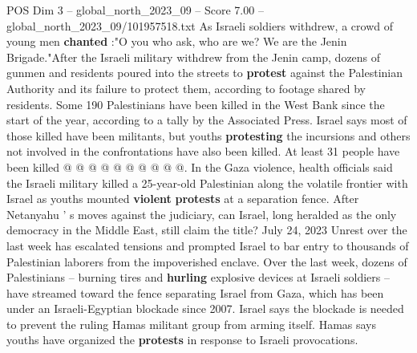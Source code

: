 \begin{textsample}{POS Dim 3 – global\_north\_2023\_09 – Score 7.00 – global\_north\_2023\_09/101957518.txt}
As Israeli soldiers withdrew, a crowd of young men \textbf{chanted} :"O you who ask, who are we?
We are the Jenin Brigade."After the Israeli military withdrew from the Jenin camp, dozens of gunmen and residents poured into the streets to \textbf{protest} against the Palestinian Authority and its failure to protect them, according to footage shared by residents.
Some 190 Palestinians have been killed in the West Bank since the start of the year, according to a tally by the Associated Press.
Israel says most of those killed have been militants, but youths \textbf{protesting} the incursions and others not involved in the confrontations have also been killed.
At least 31 people have been killed @ @ @ @ @ @ @ @ @ @.
In the Gaza violence, health officials said the Israeli military killed a 25-year-old Palestinian along the volatile frontier with Israel as youths mounted \textbf{violent} \textbf{protests} at a separation fence.
After Netanyahu ' s moves against the judiciary, can Israel, long heralded as the only democracy in the Middle East, still claim the title?
July 24, 2023 Unrest over the last week has escalated tensions and prompted Israel to bar entry to thousands of Palestinian laborers from the impoverished enclave.
Over the last week, dozens of Palestinians -- burning tires and \textbf{hurling} explosive devices at Israeli soldiers -- have streamed toward the fence separating Israel from Gaza, which has been under an Israeli-Egyptian blockade since 2007.
Israel says the blockade is needed to prevent the ruling Hamas militant group from arming itself.
Hamas says youths have organized the \textbf{protests} in response to Israeli provocations.

\end{textsample}
